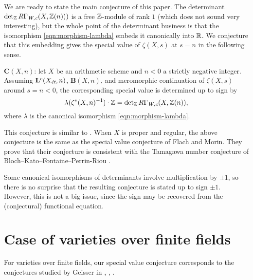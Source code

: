 \documentclass{article}
\numberwithin{equation}{section}
\begin{document}
We are ready to state the main conjecture of this paper. The determinant
$\det_\ZZ R\Gamma_\Wc (X, \ZZ (n)))$ is a free $\ZZ$-module of rank $1$ (which
does not sound very interesting), but the whole point of the determinant
business is that the isomorphism \eqref{eqn:morphism-lambda} embeds it
canonically into $\RR$. We conjecture that this embedding gives the special
value of $\zeta (X,s)$ at $s = n$ in the following sense.

\begin{conjecture}
  $\mathbf{C} (X,n)$: let $X$ be an arithmetic scheme and $n < 0$ a strictly
  negative integer. Assuming $\mathbf{L}^c (X_\et, n)$, $\mathbf{B} (X,n)$, and
  meromorphic continuation of $\zeta (X,s)$ around $s = n < 0$, the
  corresponding special value is determined up to sign by
  \[ \lambda (\zeta^* (X,n)^{-1}) \cdot \ZZ =
    \det_\ZZ R\Gamma_\Wc (X, \ZZ (n)), \]
  where $\lambda$ is the canonical isomorphism \eqref{eqn:morphism-lambda}.
\end{conjecture}

\begin{remark}
  This conjecture is similar to \cite[Conjecture 5.11]{Flach-Morin-2018}.
  When $X$ is proper and regular, the above conjecture is the same as the
  special value conjecture of Flach and Morin. They prove that their conjecture
  is consistent with the Tamagawa number conjecture of
  Bloch--Kato--Fontaine--Perrin-Riou \cite{Fontaine-Perrin-Riou-1994}.
\end{remark}

\begin{remark}
  Some canonical isomorphisms of determinants involve multiplication by $\pm 1$,
  so there is no surprise that the resulting conjecture is stated up to sign
  $\pm 1$. However, this is not a big issue, since the sign may be recovered
  from the (conjectural) functional equation.
\end{remark}


\section{Case of varieties over finite fields}
\label{sec:finite-fields}

For varieties over finite fields, our special value conjecture corresponds to
the conjectures studied by Geisser in \cite{Geisser-2004}, \cite{Geisser-2006},
\cite{Geisser-2010-arithmetic-homology}.
\end{document}
